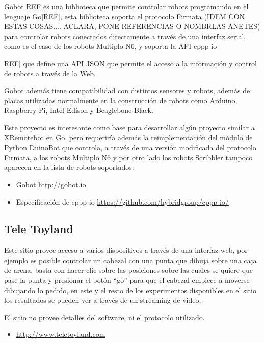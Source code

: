Gobot {REF} es una biblioteca que permite controlar robots programando en el lenguaje
Go[REF], esta biblioteca soporta el protocolo Firmata (IDEM CON ESTAS COSAS.... ACLARA, PONE REFERENCIAS O NOMBRLAS ANETES) para controlar robots
conectados directamente a través de una interfaz serial, como es el caso
de los robots Multiplo N6, y soporta la API cppp-io{REF] que define una API JSON
que permite el acceso a la información y control de robots a través de la Web.

Gobot además tiene compatibilidad con distintos sensores y robots, además de
placas utilizadas normalmente en la construcción de robots como Arduino,
Raspberry Pi, Intel Edison y Beaglebone Black.

Este proyecto es interesante como base para desarrollar algún proyecto
similar a XRemotebot en Go, pero requeriría además la reimplementación
del módulo de Python DuinoBot que controla, a través de una versión
modificada del protocolo Firmata, a los robots Multiplo N6 y por otro
lado los robots Scribbler tampoco aparecen en la lista de robots soportados.

\begin{itemize}
    \item Gobot \url{http://gobot.io}
    \item Especificación de cppp-io \url{https://github.com/hybridgroup/cppp-io/}
\end{itemize}

\subsection{Tele Toyland}

Este sitio provee acceso a varios dispositivos a través de una interfaz web,
por ejemplo es posible controlar un cabezal con una punta que dibuja sobre
una caja de arena, basta con hacer clic sobre las posiciones sobre las cuales
se quiere que pase la punta y presionar el botón ``go'' para que el cabezal
empiece a moverse dibujando lo pedido, en este y el resto de los experimentos
disponibles en el sitio los resultados se pueden ver a través de un streaming
de video.

El sitio no provee detalles del software, ni el protocolo utilizado.

\begin{itemize}
    \item \url{http://www.teletoyland.com}
\end{itemize}

}
